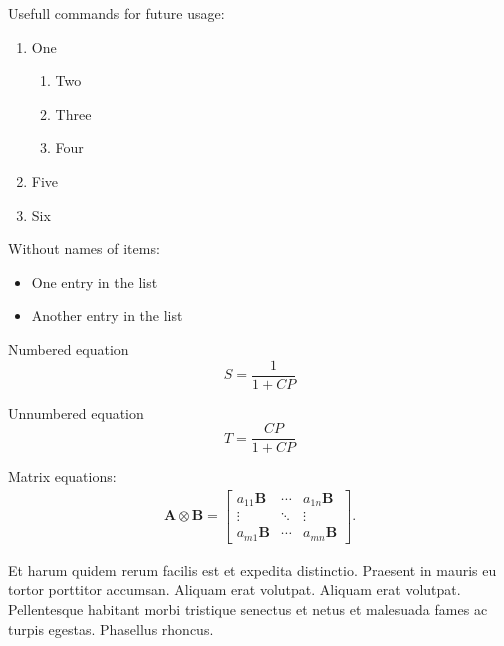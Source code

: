 \documentclass{article}
\begin{document}
\par Usefull commands for future usage:
\begin{enumerate}
	\item One
    \begin{enumerate}
    	\item Two
        \item Three
        \item Four
    \end{enumerate}
	\item Five
    \item Six
\end{enumerate}
\par Without names of items:
\begin{itemize}
  \item One entry in the list
  \item Another entry in the list
\end{itemize}
\par Numbered equation
 \begin{equation} 
  	S= \frac{1}{1+CP}
  \end{equation}
\par Unnumbered equation %
\begin{equation*}
  	T= \frac{CP}{1+CP}
  \end{equation*}
\par Matrix equations:
\begin{gather*} %
    \textbf{A} \otimes \textbf{B}= \left[\begin{array}{ccc} a_{11}\textbf{B} & \cdots & a_{1n}\textbf{B}\\ \vdots & \ddots & \vdots \\ a_{m1}\textbf{B} & \cdots & a_{mn}\textbf{B} \end{array}\right].
\end{gather*}
\par Et harum quidem rerum facilis est et expedita distinctio. Praesent in mauris eu tortor porttitor accumsan. Aliquam erat volutpat. Aliquam erat volutpat. Pellentesque habitant morbi tristique senectus et netus et malesuada fames ac turpis egestas. Phasellus rhoncus.
\end{document}
